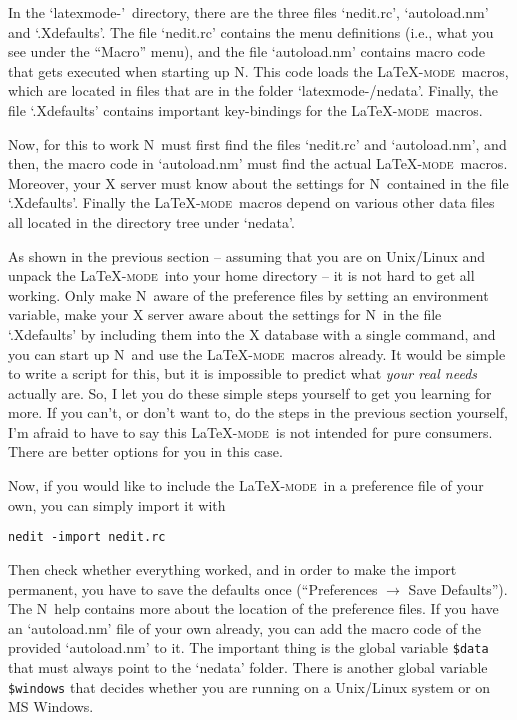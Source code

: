 \documentclass{article}
\newcommand{\latexpack}{\LaTeX-\textsc{mode}}
\newcommand{\nedit}{N\kern-0.8pt{Edit}}
\newcommand{\file}[1]{`#1'}
\newcommand{\menu}[1]{``#1''}
\newcommand{\latexpackfolder}{\file{latexmode-\lversion}}
\begin{document}
In the \latexpackfolder\ directory, there are the three files \file{nedit.rc}, \file{autoload.nm} and \file{.Xdefaults}. The file \file{nedit.rc} contains the menu definitions (i.e., what you see under the ``Macro'' menu), and the file \file{autoload.nm} contains macro code that gets executed when starting up \nedit. This code loads the \latexpack\ macros, which are located in files that are in the folder \file{latexmode-\lversion/nedata}. Finally, the file \file{.Xdefaults} contains important key-bindings for the \latexpack\ macros.

Now, for this to work \nedit\ must first find the files \file{nedit.rc} and \file{autoload.nm}, and then, the macro code in \file{autoload.nm} must find the actual \latexpack\ macros. Moreover, your X server must know about the settings for \nedit\ contained in the file \file{.Xdefaults}. Finally the \latexpack\ macros depend on various other data files all located in the directory tree under \file{nedata}.

As shown in the previous section -- assuming that you are on Unix/Linux and unpack the \latexpack\ into your home directory -- it is not hard to get all working. Only make \nedit\ aware of the preference files by setting an environment variable, make your X server aware about the settings for \nedit\ in the file `.Xdefaults' by including them into the X database with a single command, and you can start up \nedit\ and use the \latexpack\ macros already. It would be simple to write a script for this, but it is impossible to predict what \emph{your real needs} actually are. So, I let you do these simple steps yourself to get you learning for more. If you can't, or don't want to, do the steps in the previous section yourself, I'm afraid to have to say this \latexpack\ is not intended for pure consumers. There are better options for you in this case.

Now, if you would like to include the \latexpack\ in a preference file of your own, you can simply import it with%
\begin{verbatim}
nedit -import nedit.rc
\end{verbatim}
\noindent Then check whether everything worked, and in order to make the import permanent, you have to save the defaults once (\menu{Preferences $\to$ Save Defaults}). The \nedit\ help contains more about the location of the preference files. If you have an \file{autoload.nm} file of your own already, you can add the macro code of the provided \file{autoload.nm} to it. The important thing is the global variable \verb|$data| that must always point to the \file{nedata} folder. There is another global variable \verb|$windows| that decides whether you are running on a Unix/Linux system or on MS Windows.
\end{document}
